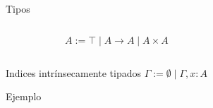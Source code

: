 \begin{frame}{Tipos}
	\begin{columns}
		\begin{column}{0.5\textwidth}
			\[ A := \top \mid A \rightarrow A \mid A \times A \]
			
			
		\end{column}
		\begin{column}{0.5\textwidth}
			\pause
		\end{column}
	\end{columns}
\end{frame}

\begin{frame}{Indices intrínsecamente tipados}
	$\Gamma := \emptyset \mid \Gamma, x:A$
	\pause
\end{frame}

\begin{frame}{Ejemplo}
\end{frame}

